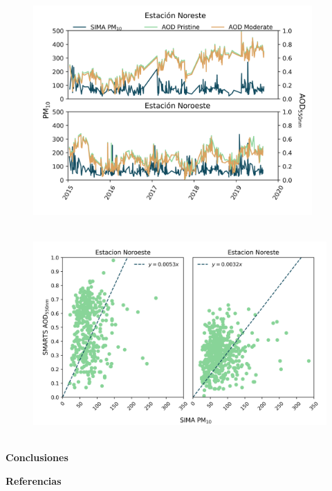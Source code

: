 \documentclass{article}
\begin{document}
\begin{center}
\begin{minipage}{0.45\linewidth}
    \begin{figure}[H]
        \centering
        \includegraphics[height=8cm]{images/AODsandPM10.png}
        \caption{}
    \end{figure}
\end{minipage}
\begin{minipage}{0.45\linewidth}
    \begin{figure}[H]
        \centering
        \includegraphics[height=8cm]{images/AODvsPM10.png}
        \caption{}
    \end{figure}
\end{minipage}
\end{center}
\begin{minipage}{0.60\linewidth}
\begin{center}
\begin{shaded}
\textbf{\textcolor{ver}{Conclusiones}}
\end{shaded}
\end{center}
\end{minipage}
\hspace{1cm}\vspace{0.5cm}
\begin{minipage}{0.35\linewidth}
\begin{center}
\begin{shaded}
\textbf{\textcolor{ver}{Referencias}}
\end{shaded}
\end{center}
\end{minipage}
\end{document}
